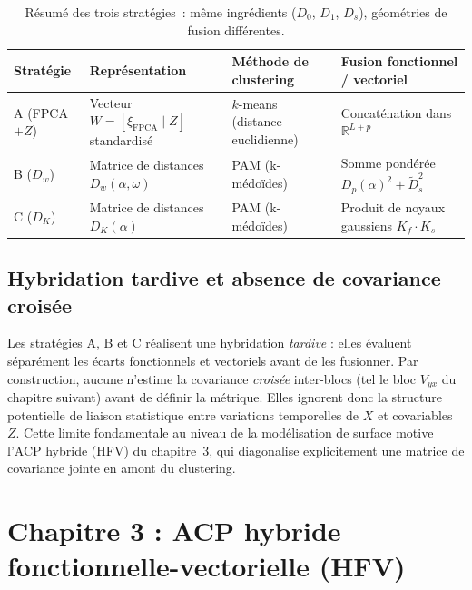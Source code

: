 \documentclass[11pt,a4paper]{article}
\newcommand{\Dw}{D_w}
\newcommand{\DK}{D_K}
\newcommand{\Dp}{D_p}
\begin{document}
\begin{table}[H]
\centering
\renewcommand{\arraystretch}{1.25}
\begin{tabular}{l p{3.3cm} p{3.4cm} p{4.0cm}}
  \toprule
  \textbf{Stratégie} & \textbf{Représentation} &
  \textbf{Méthode de clustering} & \textbf{Fusion fonctionnel / vectoriel} \\
  \midrule
  A (FPCA$+Z$) &
  Vecteur $W = [\xi_{\text{FPCA}} \mid Z]$ standardisé &
  $k$-means (distance euclidienne) &
  Concaténation dans $\mathbb{R}^{L+p}$ \\
  B ($\Dw$) &
  Matrice de distances $\Dw(\alpha,\omega)$ &
  PAM (k-médoïdes) &
  Somme pondérée $\Dp(\alpha)^2 + \tilde{D}_s^2$ \\
  C ($\DK$) &
  Matrice de distances $\DK(\alpha)$ &
  PAM (k-médoïdes) &
  Produit de noyaux gaussiens $K_f \cdot K_s$ \\
  \bottomrule
\end{tabular}
\caption{Résumé des trois stratégies~: même ingrédients ($D_0$, $D_1$, $D_s$),
géométries de fusion différentes.}
\label{tab:strategies}
\end{table}

\subsection{Hybridation tardive et absence de covariance croisée}
Les stratégies A, B et C réalisent une hybridation \emph{tardive} : elles évaluent séparément les écarts fonctionnels et vectoriels avant de les fusionner. Par construction, aucune n'estime la covariance \emph{croisée} inter-blocs (tel le bloc $V_{yx}$ du chapitre suivant) avant de définir la métrique. Elles ignorent donc la structure potentielle de liaison statistique entre variations temporelles de $X$ et covariables $Z$. Cette limite fondamentale au niveau de la modélisation de surface motive l'ACP hybride (HFV) du chapitre~3, qui diagonalise explicitement une matrice de covariance jointe en amont du clustering.

\section{Chapitre 3 : ACP hybride fonctionnelle-vectorielle (HFV)}
\end{document}

